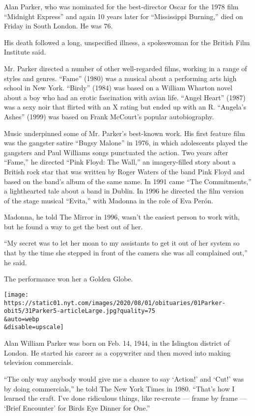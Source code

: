 Alan Parker, who was nominated for the best-director Oscar for the 1978
film ``Midnight Express'' and again 10 years later for ``Mississippi
Burning,'' died on Friday in South London. He was 76.

His death followed a long, unspecified illness, a spokeswoman for the
British Film Institute said.

Mr. Parker directed a number of other well-regarded films, working in a
range of styles and genres. ``Fame'' (1980) was a musical about a
performing arts high school in New York. ``Birdy'' (1984) was based on a
William Wharton novel about a boy who had an erotic fascination with
avian life. ``Angel Heart'' (1987) was a sexy noir that flirted with an
X rating but ended up with an R. ``Angela's Ashes'' (1999) was based on
Frank McCourt's popular autobiography.

Music underpinned some of Mr. Parker's best-known work. His first
feature film was the gangster satire ``Bugsy Malone'' in 1976, in which
adolescents played the gangsters and Paul Williams songs punctuated the
action. Two years after ``Fame,'' he directed ``Pink Floyd: The Wall,''
an imagery-filled story about a British rock star that was written by
Roger Waters of the band Pink Floyd and based on the band's album of the
same name. In 1991 came ``The Commitments,'' a lighthearted tale about a
band in Dublin. In 1996 he directed the film version of the stage
musical ``Evita,'' with Madonna in the role of Eva Perón.

Madonna, he told The Mirror in 1996, wasn't the easiest person to work
with, but he found a way to get the best out of her.

``My secret was to let her moan to my assistants to get it out of her
system so that by the time she stepped in front of the camera she was
all complained out,'' he said.

The performance won her a Golden Globe.

\texttt{[image: https://static01.nyt.com/images/2020/08/01/obituaries/01Parker-obit5/31Parker5-articleLarge.jpg?quality=75\\\&auto=webp\\\&disable=upscale]}

Alan William Parker was born on Feb. 14, 1944, in the Islington district
of London. He started his career as a copywriter and then moved into
making television commercials.

``The only way anybody would give me a chance to say `Action!' and
`Cut!' was by doing commercials,'' he told The New York Times in 1980.
``That's how I learned the craft. I've done ridiculous things, like
re-create --- frame by frame --- `Brief Encounter' for Birds Eye Dinner
for One.''

